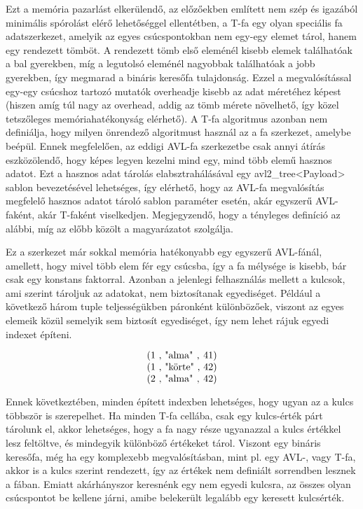 Ezt a memória pazarlást elkerülendő, az előzőekben említett nem szép és igazából minimális spórolást elérő lehetőséggel ellentétben, a T-fa egy olyan speciális fa adatszerkezet, amelyik az egyes csúcspontokban nem egy-egy elemet tárol, hanem egy rendezett tömböt.
A rendezett tömb első eleménél kisebb elemek találhatóak a bal gyerekben, míg a legutolsó eleménél nagyobbak találhatóak a jobb gyerekben, így megmarad a bináris keresőfa tulajdonság. 
Ezzel a megvalósítással egy-egy csúcshoz tartozó mutatók overheadje kisebb az adat méretéhez képest (hiszen amíg túl nagy az overhead, addig az tömb mérete növelhető, így közel tetszőleges memóriahatékonyság elérhető).
A T-fa algoritmus azonban nem definiálja, hogy milyen önrendező algoritmust használ az a fa szerkezet, amelybe beépül.
Ennek megfelelően, az eddigi AVL-fa szerkezetbe csak annyi átírás eszközölendő, hogy képes legyen kezelni mind egy, mind több elemű hasznos adatot. 
Ezt a hasznos adat tárolás elabsztrahálásával egy {\ibmmono avl2_tree<Payload>} sablon bevezetésével lehetséges, így elérhető, hogy az AVL-fa megvalósítás megfelelő hasznos adatot tároló sablon paraméter esetén, akár egyszerű AVL-faként, akár T-faként viselkedjen.
Megjegyzendő, hogy a tényleges definíció az alábbi, míg az előbb közölt a magyarázatot szolgálja.

\endcode

Ez a szerkezet már sokkal memória hatékonyabb egy egyszerű AVL-fánál, amellett, hogy mivel több elem fér egy csúcsba, így a fa mélysége is kisebb, bár csak egy konstans faktorral.
Azonban a jelenlegi felhasználás mellett a kulcsok, ami szerint tároljuk az adatokat, nem biztosítanak egyediséget. 
Például a következő három tuple teljességükben páronként különbözőek, viszont az egyes elemeik közül semelyik sem biztosít egyediséget, így nem lehet rájuk egyedi indexet építeni.

$$\vbox{\halign{\hss(#, &#, &#)\hss\cr
	1 & "alma" & 41\cr
	1 & "körte" & 42\cr
	2 & "alma" & 42\cr}}$$

Ennek következtében, minden épített indexben lehetséges, hogy ugyan az a kulcs többször is szerepelhet.
Ha minden T-fa cellába, csak egy kulcs-érték párt tárolunk el, akkor lehetséges, hogy a fa nagy része ugyanazzal a kulcs értékkel lesz feltöltve, és mindegyik különböző értékeket tárol.
Viszont egy bináris keresőfa, még ha egy komplexebb megvalósításban, mint pl. egy AVL-, vagy T-fa, akkor is a kulcs szerint rendezett, így az értékek nem definiált sorrendben lesznek a fában.
Emiatt akárhányszor keresnénk egy nem egyedi kulcsra, az összes olyan csúcspontot be kellene járni, amibe belekerült legalább egy keresett kulcsérték.

